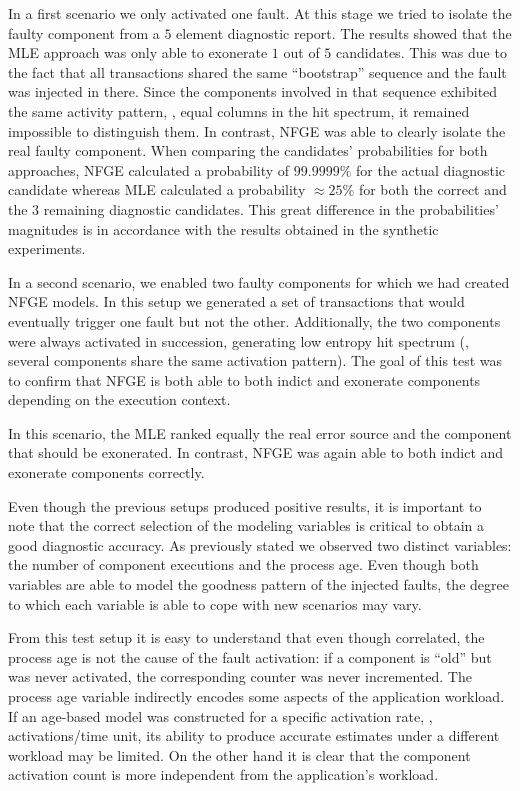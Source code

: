 In a first scenario we only activated one fault.
%
At this stage we tried to isolate the faulty component from a $5$
element diagnostic report.
%
The results showed that the \ac{MLE} approach was only able to
exonerate $1$ out of $5$ candidates.
%
This was due to the fact that all transactions shared the same
``bootstrap'' sequence and the fault was injected in there.
%
Since the components involved in that sequence exhibited the same
activity pattern, \ie, equal columns in the hit spectrum, it remained
impossible to distinguish them.
%
In contrast, \ac{NFGE} was able to clearly isolate the real faulty
component.
%
When comparing the candidates' probabilities for both approaches,
\ac{NFGE} calculated a probability of $99.9999\%$ for the actual
diagnostic candidate whereas \ac{MLE} calculated a probability
$\approx 25\%$ for both the correct and the $3$
remaining diagnostic candidates.
%
This great difference in the probabilities' magnitudes is in
accordance with the results obtained in the synthetic experiments.

In a second scenario, we enabled two faulty components for which we
had created \ac{NFGE} models.
%
In this setup we generated a set of transactions that would eventually
trigger one fault but not the other.
%
Additionally, the two components were always activated in succession,
generating low entropy hit spectrum (\ie, several components share
the same activation pattern).
%
The goal of this test was to confirm that \ac{NFGE} is both able to both
indict and exonerate components depending on the execution context.

In this scenario, the \ac{MLE} ranked equally the real error source
and the component that should be exonerated.
%
In contrast, \ac{NFGE} was again able to both indict and exonerate
components correctly.

Even though the previous setups produced positive results, it is
important to note that the correct selection of the modeling variables
is critical to obtain a good diagnostic accuracy.
%
As previously stated we observed two distinct variables: the number of
component executions and the process age.
%
Even though both variables are able to model the goodness pattern of
the injected faults, the degree to which each variable is able to cope
with new scenarios may vary.

From this test setup it is easy to understand that even though
correlated, the process age is not the cause of the fault activation:
if a component is ``old'' but was never activated, the corresponding
counter was never incremented.
%
The process age variable indirectly encodes some aspects of the
application workload.
%
If an age-based model was constructed for a specific activation rate,
\ie, activations/time unit, its ability to produce accurate estimates
under a different workload may be limited.
%
On the other hand it is clear that the component activation count is
more independent from the application's workload.

